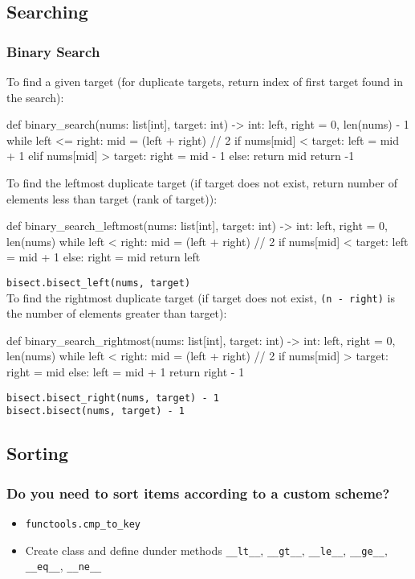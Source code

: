 \documentclass[12pt, titlepage]{article}
\begin{document}
\subsection{Searching}

\subsubsection{Binary Search}
To find a given target (for duplicate targets, return index of first target found in the search):
\begin{python}
def binary_search(nums: list[int], target: int) -> int:
    left, right = 0, len(nums) - 1
    while left <= right:
        mid = (left + right) // 2
        if nums[mid] < target:
            left = mid + 1
        elif nums[mid] > target:
            right = mid - 1
        else:
            return mid
    return -1
\end{python}
\bigskip

To find the leftmost duplicate target (if target does not exist, return number of elements less than target (rank of target)):
\begin{python}
def binary_search_leftmost(nums: list[int], target: int) -> int:
    left, right = 0, len(nums)
    while left < right:
        mid = (left + right) // 2
        if nums[mid] < target:
            left = mid + 1
        else:
            right = mid
    return left
\end{python}
\texttt{bisect.bisect\_left(nums, target)} \\

To find the rightmost duplicate target (if target does not exist, \texttt{(n - right)} is the number of elements greater than target):
\begin{python}
def binary_search_rightmost(nums: list[int], target: int) -> int:
    left, right = 0, len(nums)
    while left < right:
        mid = (left + right) // 2
        if nums[mid] > target:
            right = mid
        else:
            left = mid + 1
    return right - 1
\end{python}
\texttt{bisect.bisect\_right(nums, target) - 1} \\
\texttt{bisect.bisect(nums, target) - 1}

\subsection{Sorting}

\subsubsection{Do you need to sort items according to a custom scheme?}
\begin{itemize}
  \item \texttt{functools.cmp\_to\_key} 
  \item Create class and define dunder methods \texttt{\_\_lt\_\_}, \texttt{\_\_gt\_\_}, \texttt{\_\_le\_\_}, \texttt{\_\_ge\_\_}, \texttt{\_\_eq\_\_}, \texttt{\_\_ne\_\_}
\end{itemize}
\bigskip
\end{document}
